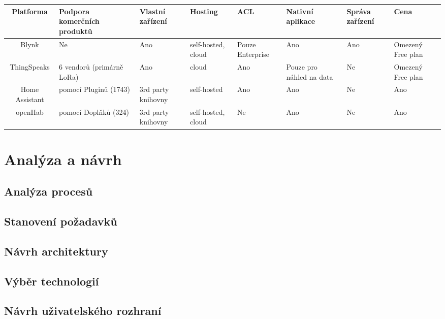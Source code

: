 \documentclass[thesis=B,czech]{FITthesis}[2019/12/23]
\begin{document}
\begin{center} %
    \begin{tabular}{ |c| m{5em}| m{5em}|m{5em}|m{4em}| m{5em}| m{4em}| m{4em}| } 
     \hline 
     Platforma & Podpora komerčních produktů & Vlastní zařízení & Hosting & ACL & Nativní aplikace & Správa zařízení & Cena \\
     \hline
     Blynk & Ne & Ano & self-hosted, cloud & Pouze Enterprise & Ano & Ano &  Omezený Free plan\\
     \hline
     ThingSpeaks & 6 vendorů (primárně LoRa) & Ano & cloud & Ano & Pouze pro náhled na data & Ne & Omezený Free plan\\
     \hline
Home Assistant & pomocí Pluginů (1743) & 3rd party knihovny & self-hosted & Ano & Ano & Ne & Ano\\
\hline
openHab & pomocí Doplňků (324) & 3rd party knihovny & self-hosted, cloud & Ne & Ano & Ne & Ano\\
     \hline
    \end{tabular}
    \end{center} 


\chapter{Analýza a návrh}

\section{Analýza procesů}

\section{Stanovení požadavků}

\section{Návrh architektury}

\section{Výběr technologií}

\section{Návrh uživatelského rozhraní}
\end{document}
